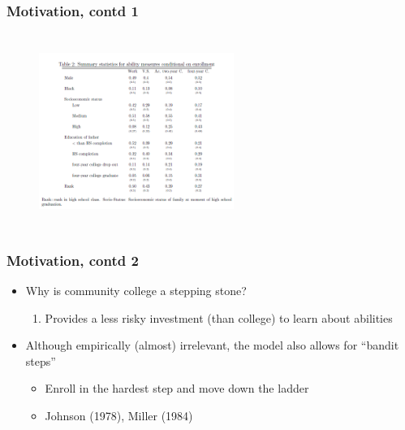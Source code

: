 \begin{frame}
	\frametitle{Motivation, contd 1}
			\begin{figure}[H] 
				\caption*{}
				\centering
				\includegraphics[width=2.5in, height=2.5in]{Figures/T/table2.png}
			\end{figure}
\end{frame}

\begin{frame}
	\frametitle{Motivation, contd 2}
		\begin{itemize}
			\item Why is community college a stepping stone?
				\begin{enumerate}
					\item Provides a less risky investment (than college) to learn about abilities
				\end{enumerate}
			\item Although empirically (almost) irrelevant, the model also allows for ``bandit steps''
				\begin{itemize}
					\item Enroll in the hardest step and move down the ladder
					\item Johnson (1978), Miller (1984)
				\end{itemize}
		\end{itemize}
\end{frame}

